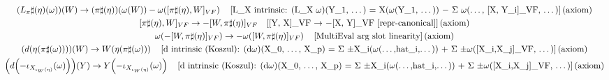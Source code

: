 \documentclass[11pt]{article}
\begin{document}
{\begin{gather*}
\left(L_\pi\sharp(\eta)\!\left(\omega\right)\right)\!\left(W\right) \to \left(\pi\sharp\!\left(\eta\right)\right)\!\left(\omega\!\left(W\right)\right) - \omega\!\left([\pi\sharp(\eta),W]_{VF}\right) \quad \text{[L\_X intrinsic: (L\_X \ensuremath{\omega})(Y\_1, \ensuremath{\dots}) = X(\ensuremath{\omega}(Y\_1, \ensuremath{\dots})) \ensuremath{-} \ensuremath{\Sigma} \ensuremath{\omega}(\ensuremath{\dots}, [X, Y\_i]\_VF, \ensuremath{\dots})]\,(axiom)} \\
[\pi\sharp(\eta),W]_{VF} \to -[W,\pi\sharp(\eta)]_{VF} \quad \text{[[Y, X]\_VF \ensuremath{\to} \ensuremath{-}[X, Y]\_VF  [repr-canonical]]\,(axiom)} \\
\omega\!\left(-[W,\pi\sharp(\eta)]_{VF}\right) \to -\omega\!\left([W,\pi\sharp(\eta)]_{VF}\right) \quad \text{[MultiEval arg slot linearity]\,(axiom)} \\
\left(d\!\left(\eta\!\left(\pi\sharp\!\left(\omega\right)\right)\right)\right)\!\left(W\right) \to W\!\left(\eta\!\left(\pi\sharp\!\left(\omega\right)\right)\right) \quad \text{[d intrinsic (Koszul): (d\ensuremath{\omega})(X\_0, \ensuremath{\dots}, X\_p) = \ensuremath{\Sigma} \ensuremath{\pm}X\_i(\ensuremath{\omega}(\ensuremath{\dots},hat\_i,\ensuremath{\dots})) + \ensuremath{\Sigma} \ensuremath{\pm}\ensuremath{\omega}([X\_i,X\_j]\_VF, \ensuremath{\dots})]\,(axiom)} \\
\left(d\!\left(-\iota_{X_{\iota_W(\eta)}}\!\left(\omega\right)\right)\right)\!\left(Y\right) \to Y\!\left(-\iota_{X_{\iota_W(\eta)}}\!\left(\omega\right)\right) \quad \text{[d intrinsic (Koszul): (d\ensuremath{\omega})(X\_0, \ensuremath{\dots}, X\_p) = \ensuremath{\Sigma} \ensuremath{\pm}X\_i(\ensuremath{\omega}(\ensuremath{\dots},hat\_i,\ensuremath{\dots})) + \ensuremath{\Sigma} \ensuremath{\pm}\ensuremath{\omega}([X\_i,X\_j]\_VF, \ensuremath{\dots})]\,(axiom)} \\

\end{gather*}}
\end{document}
